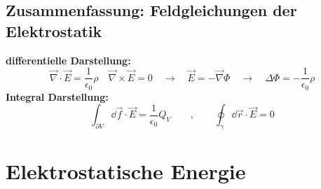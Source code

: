 \subsection{Zusammenfassung: Feldgleichungen der Elektrostatik}

\textbf{differentielle Darstellung:}
\begin{equation*}
\vec{\nabla}\cdot \vec{E} = \frac{1}{\epsilon_0} \rho \quad \vec{\nabla} \times \vec{E} = 0 \quad \rightarrow \quad \vec{E} = - \vec{\nabla} \Phi \quad \rightarrow \quad \Delta \Phi = - \frac{1}{\epsilon_0} \rho
\end{equation*}
\textbf{Integral Darstellung:}
\begin{equation*}
\int_{\partial V} \dd\vec{f} \cdot \vec{E} = \frac{1}{\epsilon_0} Q_V \qquad , \qquad \oint_\gamma \dd\vec{r} \cdot \vec{E} = 0
\end{equation*}

\section{Elektrostatische Energie}


